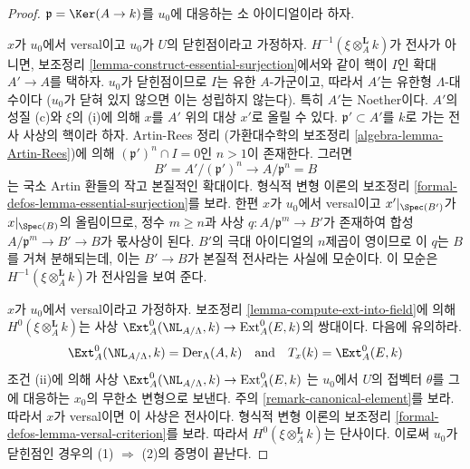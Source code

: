 \begin{proof}
$\mathfrak p = \Ker(A \to k)$를 $u_0$에 대응하는 소 아이디얼이라 하자.

\medskip\noindent
$x$가 $u_0$에서 versal이고 $u_0$가 $U$의 닫힌점이라고 가정하자.
$H^{-1}(\xi \otimes_A^{\mathbf{L}} k)$가 전사가 아니면,
보조정리 \ref{lemma-construct-essential-surjection}에서와 같이
핵이 $I$인 확대 $A' \to A$를 택하자.
$u_0$가 닫힌점이므로 $I$는 유한 $A$-가군이고, 따라서 $A'$는 유한형
$\Lambda$-대수이다 ($u_0$가 닫혀 있지 않으면 이는 성립하지 않는다).
특히 $A'$는 Noether이다.
$A'$의 성질 (c)와 $\xi$의 (i)에 의해 $x$를 $A'$ 위의 대상 $x'$로
올릴 수 있다.
$\mathfrak p' \subset A'$를 $k$로 가는 전사 사상의 핵이라 하자.
Artin-Rees 정리 (가환대수학의 보조정리 \ref{algebra-lemma-Artin-Rees})에
의해 $(\mathfrak p')^n \cap I = 0$인 $n > 1$이 존재한다. 그러면
$$
B' = A'/(\mathfrak p')^n \longrightarrow A/\mathfrak p^n = B
$$
는 국소 Artin 환들의 작고 본질적인 확대이다. 형식적 변형 이론의
보조정리 \ref{formal-defos-lemma-essential-surjection}를 보라.
한편 $x$가 $u_0$에서 versal이고 $x'|_{\Spec(B')}$가
$x|_{\Spec(B)}$의 올림이므로, 정수 $m \geq n$과 사상
$q : A/\mathfrak p^m \to B'$가 존재하여 합성
$A/\mathfrak p^m \to B' \to B$가 몫사상이 된다.
$B'$의 극대 아이디얼의 $n$제곱이 영이므로 이 $q$는 $B$를 거쳐
분해되는데, 이는 $B' \to B$가 본질적 전사라는 사실에 모순이다.
이 모순은 $H^{-1}(\xi \otimes_A^{\mathbf{L}} k)$가 전사임을 보여 준다.

\medskip\noindent
$x$가 $u_0$에서 versal이라고 가정하자.
보조정리 \ref{lemma-compute-ext-into-field}에 의해
$H^0(\xi \otimes_A^{\mathbf{L}} k)$는 사상
$\Ext^0_A(\NL_{A/\Lambda}, k) \to \text{Ext}^0_A(E, k)$의 쌍대이다.
다음에 유의하라.
$$
\Ext^0_A(\NL_{A/\Lambda}, k) = \text{Der}_\Lambda(A, k)
\quad\text{and}\quad
T_x(k) = \Ext^0_A(E, k)
$$
조건 (ii)에 의해 사상
$\Ext^0_A(\NL_{A/\Lambda}, k) \to \text{Ext}^0_A(E, k)$
는 $u_0$에서 $U$의 접벡터 $\theta$를 그에 대응하는 $x_0$의 무한소
변형으로 보낸다. 주의 \ref{remark-canonical-element}를 보라.
따라서 $x$가 versal이면 이 사상은 전사이다. 형식적 변형 이론의
보조정리 \ref{formal-defos-lemma-versal-criterion}를 보라.
따라서 $H^0(\xi \otimes_A^{\mathbf{L}} k)$는 단사이다.
이로써 $u_0$가 닫힌점인 경우의 (1) $\Rightarrow$ (2)의 증명이 끝난다.


\end{proof}
